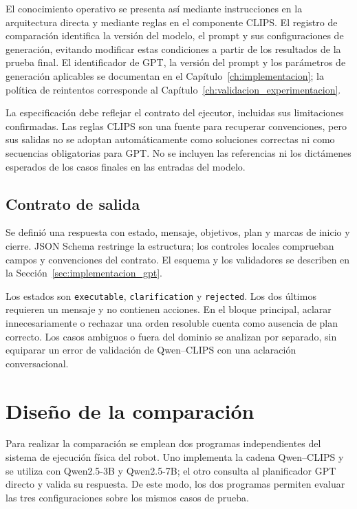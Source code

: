 El conocimiento operativo se presenta así mediante instrucciones en la
arquitectura directa y mediante reglas en el componente CLIPS. El registro de
comparación identifica la versión del modelo, el prompt y sus
configuraciones de generación, evitando modificar estas condiciones a
partir de los resultados de la prueba final. El identificador de GPT, la versión del prompt y los parámetros de generación aplicables se documentan en el Capítulo~\ref{ch:implementacion}; la política de reintentos corresponde al Capítulo~\ref{ch:validacion_experimentacion}.

La especificación debe reflejar el contrato del ejecutor, incluidas sus limitaciones confirmadas. Las reglas CLIPS son una fuente para recuperar convenciones, pero sus salidas no se adoptan automáticamente como soluciones correctas ni como secuencias obligatorias para GPT. No se incluyen las referencias ni los dictámenes esperados de los casos finales en las entradas del modelo.



\subsection{Contrato de salida}

Se definió una respuesta con estado, mensaje, objetivos, plan y marcas de inicio y cierre. JSON Schema restringe la estructura; los controles locales comprueban campos y convenciones del contrato. El esquema y los validadores se describen en la Sección~\ref{sec:implementacion_gpt}.

Los estados son \texttt{executable}, \texttt{clarification} y \texttt{rejected}. Los dos últimos requieren un mensaje y no contienen acciones. En el bloque principal, aclarar innecesariamente o rechazar una orden resoluble cuenta como ausencia de plan correcto. Los casos ambiguos o fuera del dominio se analizan por separado, sin equiparar un error de validación de Qwen--CLIPS con una aclaración conversacional.

\section{Diseño de la comparación}
\label{sec:diseno_comparacion}

Para realizar la comparación se emplean dos programas independientes
del sistema de ejecución física del robot. Uno implementa la cadena
Qwen--CLIPS y se utiliza con Qwen2.5-3B y Qwen2.5-7B; el otro consulta
al planificador GPT directo y valida su respuesta. De este modo,
los dos programas permiten evaluar las tres configuraciones sobre
los mismos casos de prueba.

